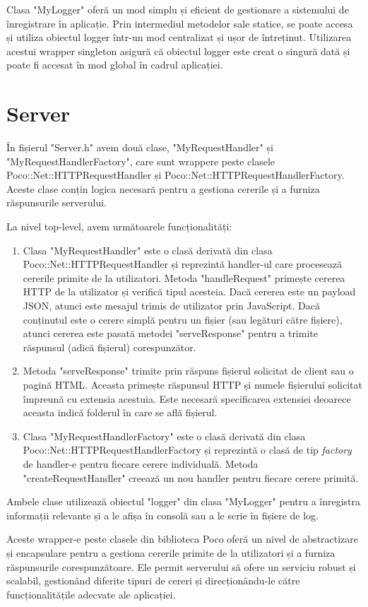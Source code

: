 Clasa "MyLogger" oferă un mod simplu și eficient de gestionare a sistemului de înregistrare în aplicație. Prin intermediul metodelor sale statice, se poate accesa și utiliza obiectul logger într-un mod centralizat și ușor de întreținut. Utilizarea acestui wrapper singleton asigură că obiectul logger este creat o singură dată și poate fi accesat în mod global în cadrul aplicației.

\section{Server}

În fișierul "Server.h" avem două clase, "MyRequestHandler" și "MyRequestHandlerFactory", care sunt wrappere peste clasele Poco::Net::HTTPRequestHandler și Poco::Net::HTTPRequestHandlerFactory. Aceste clase conțin logica necesară pentru a gestiona cererile și a furniza răspunsurile serverului.

La nivel top-level, avem următoarele funcționalități:

\begin{enumerate}
  \item Clasa "MyRequestHandler" este o clasă derivată din clasa Poco::Net::HTTPRequestHandler și reprezintă handler-ul care procesează cererile primite de la utilizatori. Metoda "handleRequest" primește cererea HTTP de la utilizator și verifică tipul acesteia. Dacă cererea este un payload JSON, atunci este mesajul trimis de utilizator prin JavaScript. Dacă conținutul este o cerere simplă pentru un fișier (sau legături către fișiere), atunci cererea este pasată metodei "serveResponse" pentru a trimite răspunsul (adică fișierul) corespunzător.

  \item Metoda "serveResponse" trimite prin răspuns fișierul solicitat de client sau o pagină HTML. Aceasta primește răspunsul HTTP și numele fișierului solicitat împreună cu extensia acestuia. Este necesară specificarea extensiei deoarece aceasta indică folderul în care se află fișierul.

  \item Clasa "MyRequestHandlerFactory" este o clasă derivată din clasa Poco::Net::HTTPRequestHandlerFactory și reprezintă o clasă de tip \emph{factory} de handler-e pentru fiecare cerere individuală. Metoda "createRequestHandler" creează un nou handler pentru fiecare cerere primită.
\end{enumerate}

Ambele clase utilizează obiectul "logger" din clasa "MyLogger" pentru a înregistra informații relevante și a le afișa în consolă sau a le scrie în fișiere de log.

Aceste wrapper-e peste clasele din biblioteca Poco oferă un nivel de abstractizare și encapsulare pentru a gestiona cererile primite de la utilizatori și a furniza răspunsurile corespunzătoare. Ele permit serverului să ofere un serviciu robust și scalabil, gestionând diferite tipuri de cereri și direcționându-le către funcționalitățile adecvate ale aplicației.